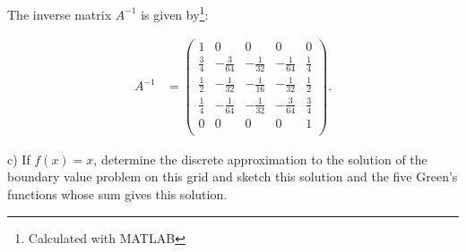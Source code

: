 \begin{solution}\ \\\\
    The inverse matrix $A^{-1}$ is given by\footnote{Calculated with MATLAB}:

    \begingroup
    \renewcommand*{\arraystretch}{1.5}
    \begin{align*}
        A^{-1} &=
        \begin{pmatrix}
                      1 &             0 &             0  &             0 &           0 \\
            \frac{3}{4} & -\frac{3}{64} & -\frac{1}{32}  & -\frac{1}{64} & \frac{1}{4} \\
            \frac{1}{2} & -\frac{1}{32} & -\frac{1}{16}  & -\frac{1}{32} & \frac{1}{2} \\
            \frac{1}{4} & -\frac{1}{64} & -\frac{1}{32}  & -\frac{3}{64} & \frac{3}{4} \\
                      0 &             0 &             0  &             0 &           1 \\
        \end{pmatrix}.
    \end{align*}
    \endgroup
\end{solution}

\pagebreak
c) If $f(x) = x$, determine the discrete approximation to the solution of the boundary value problem on this grid and
   sketch this solution and the five Green's functions whose sum gives this solution.


